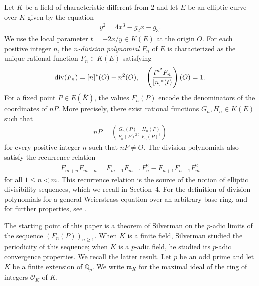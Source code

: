 \documentclass[11pt]{amsart}
\theoremstyle{definition}
\newcommand{\Q}{\mathbb{Q}}
\begin{document}
Let $K$ be a field of characteristic different from $2$ and let $E$ be an elliptic curve over $K$ given by the equation
%
\begin{align}\label{WeiEq}
y^2=4x^3-g_2x-g_3.
\end{align}
%
We use the local parameter $t=-2x/y \in K(E)$ at the origin $O$. For each positive integer $n$, the {\it $n$-division polynomial} $F_n$ of $E$ is characterized as the unique rational function $F_n \in K(E)$ satisfying
%
\begin{align*}
{\rm div}(F_n)=[n]^{\ast}(O)-n^2(O), \quad \left(\frac{t^{n^2}F_n}{[n]^{\ast}(t)}\right)(O)=1.
\end{align*}
%
For a fixed point $P \in E(\overline{K})$, the values $F_n(P)$ encode the denominators of
the coordinates of $nP$. More precisely, there exist rational functions $G_n, H_n \in K(E)$ such that
%
\begin{align*}
nP=\left(\frac{ G_n(P)}{F_n(P)^2}, \frac{ H_n(P)}{F_n(P)^3}\right)
\end{align*}
%
for every positive integer $n$ such that $nP \neq O$.
The division polynomials also satisfy the recurrence relation
%
\begin{align*}
F_{m+n}F_{m-n}=F_{m+1}F_{m-1}F_n^2-F_{n+1}F_{n-1}F_m^2
\end{align*}
%
for all $1 \leq n < m$. This recurrence relation is the source of the notion
of elliptic divisibility sequences, which we recall in Section~4.  
For the definition of division polynomials for a general Weierstrass
equation over an arbitrary base ring, and for further properties, see \cite[Appendix I]{MT91}.


The starting point of this paper is a theorem of Silverman on the $p$-adic
limits of the sequence $(F_n(P))_{n\geq 1}$. When $K$ is a finite field,
Silverman studied the periodicity of this sequence; when $K$ is a $p$-adic
field, he studied its $p$-adic convergence properties. We recall the latter
result. Let $p$ be an odd prime and let $K$ be a finite extension of $\Q_p$. We write $\mathfrak{m}_K$ for the maximal ideal of the ring of integers $\mathcal{O}_K$ of $K$.
\end{document}
